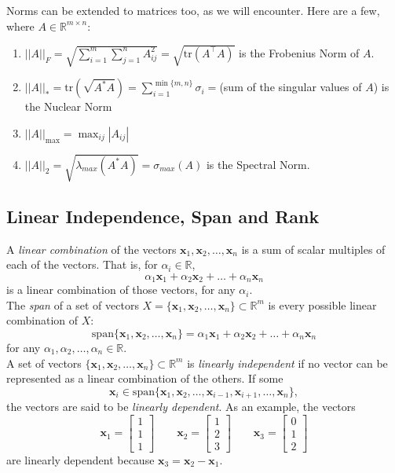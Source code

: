 \documentclass{article}
\newcommand{\1}{\mathbf{1}}
\newcommand{\tr}{\mathrm{tr}}
\newcommand{\0}{\mathbf{0}}
\newcommand{\xx}{\mathbf{x}}
\newcommand{\RR}{\mathbb{R}}
\newcommand{\T}{\top}
\newcommand{\m}[1]{\begin{bmatrix} #1 \end{bmatrix}}
\begin{document}
Norms can be extended to matrices too, as we will encounter. Here are
a few, where $A\in\RR^{m\times n}$:
\begin{enumerate}
    \item $||A||_F = \sqrt{\sum_{i=1}^m\sum_{j=1}^n A_{ij}^2} = \sqrt{\tr(A^\T A)}$ is the Frobenius Norm of $A$.
    \item $||A||_* = \tr(\sqrt{A^* A}) = \sum_{i=1}^{\min\{m,n\}}\sigma_i = $(sum of the singular values of $A$) is the Nuclear Norm
    \item $||A||_{\mathrm{max}} = \max_{ij}|A_{ij}|$
    \item $||A||_2 = \sqrt{\lambda_{max}(A^* A)} = \sigma_{max}(A)$ is the Spectral Norm.
\end{enumerate}

\subsection{Linear Independence, Span and Rank}

A \textit{linear combination} of the vectors $\xx_1,\xx_2,\dots,\xx_n$ is a sum
of scalar multiples of each of the vectors. That is, for $\alpha_i\in\RR$,
\[
    \alpha_1\xx_1 + \alpha_2\xx_2 + \dots + \alpha_n\xx_n
\]
is a linear combination of those vectors, for any $\alpha_i$.\\

The \textit{span} of a set of vectors $X = \{\xx_1,\xx_2,\dots,\xx_n\} \subset \RR^m$
is every possible linear combination of $X$:
\[
    \mathrm{span}\{\xx_1,\xx_2,\dots,\xx_n\} = \alpha_1\xx_1 + \alpha_2\xx_2 + \dots + \alpha_n\xx_n
\]
for any $\alpha_1,\alpha_2,\dots,\alpha_n\in\RR$.\\

A set of vectors $\{\xx_1,\xx_2,\dots,\xx_n\} \subset \RR^m$ is
\textit{linearly independent} if no vector can be represented as
a linear combination of the others. If some
\[
    \xx_i \in \mathrm{span}\{\xx_1,\xx_2,\dots, \xx_{i-1}, \xx_{i+1},\dots,\xx_n\},
\]
the vectors are said to be \textit{linearly dependent}. As an example,
the vectors
\[
    \xx_1 = \m{1\\1\\1} \qquad \xx_2 = \m{1\\2\\3} \qquad \xx_3 = \m{0\\1\\2}
\]
are linearly dependent because $\xx_3 = \xx_2-\xx_1$.\\
\end{document}
